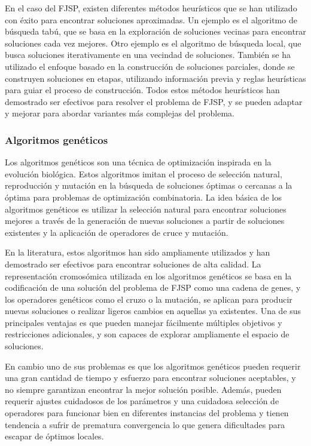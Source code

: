 En el caso del FJSP, existen diferentes métodos heurísticos que se han utilizado con éxito 
para encontrar soluciones aproximadas. Un ejemplo es el algoritmo de búsqueda tabú, 
que se basa en la exploración de soluciones vecinas para encontrar soluciones cada vez mejores. 
Otro ejemplo es el algoritmo de búsqueda local, que busca soluciones iterativamente en una 
vecindad de soluciones. También se ha utilizado el enfoque basado en la construcción de 
soluciones parciales, donde se construyen soluciones en etapas, utilizando información previa 
y reglas heurísticas para guiar el proceso de construcción. Todos estos métodos heurísticos 
han demostrado ser efectivos para resolver el problema de FJSP, y se pueden adaptar y mejorar 
para abordar variantes más complejas del problema.

\subsubsection{Algoritmos genéticos}
Los algoritmos genéticos son una técnica de optimización inspirada en la evolución biológica.
Estos algoritmos imitan el proceso de selección natural, reproducción y mutación en la búsqueda 
de soluciones óptimas o cercanas a la óptima para problemas de optimización combinatoria. La 
idea básica de los algoritmos genéticos es utilizar la selección natural para encontrar soluciones
mejores a través de la generación de nuevas soluciones a partir de soluciones existentes y la 
aplicación de operadores de cruce y mutación.\medskip

En la literatura, estos algoritmos han sido ampliamente utilizados y han demostrado ser 
efectivos para encontrar soluciones de alta calidad. La representación cromosómica utilizada 
en los algoritmos genéticos se basa en la codificación de una solución del problema de FJSP 
como una cadena de genes, y los operadores genéticos como el cruzo o la mutación, se aplican 
para producir nuevas soluciones o realizar ligeros cambios en aquellas ya existentes. Una de 
sus principales ventajas es que pueden manejar fácilmente múltiples objetivos y restricciones 
adicionales, y son capaces de explorar ampliamente el espacio de soluciones.\medskip

En cambio uno de sus problemas es que los algoritmos genéticos pueden requerir una gran cantidad 
de tiempo y esfuerzo para encontrar soluciones aceptables, y no siempre garantizan encontrar la 
mejor solución posible. Además, pueden requerir ajustes cuidadosos de los parámetros y una 
cuidadosa selección de operadores para funcionar bien en diferentes instancias del problema y 
tienen tendencia a sufrir de prematura convergencia lo que genera dificultades para escapar de 
óptimos locales.

